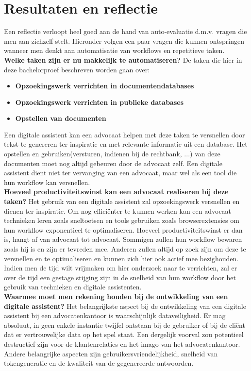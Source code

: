 \chapter{Resultaten en reflectie}
Een reflectie verloopt heel goed aan de hand van auto-evaluatie d.m.v. vragen die men aan zichzelf stelt. 
Hieronder volgen een paar vragen die kunnen ontspringen wanneer men denkt aan automatisatie van workflows en repetitieve taken.\\ 

\textbf{Welke taken zijn er nu makkelijk te automatiseren?}
De taken die hier in deze bachelorproef beschreven worden gaan over:
\begin{itemize}
	\item \textbf{Opzoekingswerk verrichten in documentendatabases}
	\item \textbf{Opzoekingswerk verrichten in publieke databases}
	\item \textbf{Opstellen van documenten}
\end{itemize}
Een digitale assistent kan een advocaat helpen met deze taken te versnellen door tekst te genereren ter inspiratie en met relevante informatie uit een database. 
Het opstellen en gebruiken(versturen, indienen bij de rechtbank, ...) van deze documenten moet nog altijd gebeuren door de advocaat zelf. 
Een digitale assistent dient niet ter vervanging van een advocaat, maar wel als een tool die hun workflow kan versnellen. \\ 

\textbf{Hoeveel productiviteitswinst kan een advocaat realiseren bij deze taken?}
Het gebruik van een digitale assistent zal opzoekingswerk versnellen en dienen ter inspiratie. 
Om nog efficiënter te kunnen werken kan een advocaat technieken leren zoals sneltoetsen en tools gebruiken zoals browserextensies om hun workflow exponentieel te optimaliseren. 
Hoeveel productiviteitswinst er dan is, hangt af van advocaat tot advocaat. 
Sommigen zullen hun workflow bewaren zoals hij is en zijn er tevreden mee. 
Anderen zullen altijd op zoek zijn om deze te versnellen en te optimaliseren en kunnen zich hier ook actief mee bezighouden. 
Indien men de tijd wilt vrijmaken om hier onderzoek naar te verrichten, zal er over de tijd een gestage stijging 
zijn in de snelheid van hun workflow door het gebruik van technieken en digitale assistenten. \\ 

\textbf{Waarmee moet men rekening houden bij de ontwikkeling van een digitale assistent?}
Het belangrijkste aspect bij de ontwikkeling van een digitale assistent bij een advocatenkantoor is waarschijnlijk dataveiligheid. 
Er mag absoluut, in geen enkele instantie twijfel ontstaan bij de gebruiker of bij de cliënt dat er vertrouwelijke data op het spel staat.  
Een dergelijk voorval zou potentieel destructief zijn voor de klantenrelaties en het imago van het advocatenkantoor. 
Andere belangrijke aspecten zijn gebruikersvriendelijkheid, snelheid van tokengeneratie en de kwaliteit van de gegenereerde antwoorden.\\ 

